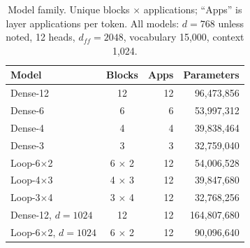 \begin{table}[t]
\centering
\caption{Model family. Unique blocks $\times$ applications; ``Apps'' is layer applications per token. All models: $d{=}768$ unless noted, 12 heads, $d_{ff}{=}2048$, vocabulary 15{,}000, context 1{,}024.}
\label{tab:models}
\begin{tabular}{lcrr}
\toprule
Model & Blocks & Apps & Parameters \\
\midrule
Dense-12 & 12 & 12 & 96,473,856 \\
Dense-6 & 6 & 6 & 53,997,312 \\
Dense-4 & 4 & 4 & 39,838,464 \\
Dense-3 & 3 & 3 & 32,759,040 \\
Loop-6$\times$2 & 6 $\times$ 2 & 12 & 54,006,528 \\
Loop-4$\times$3 & 4 $\times$ 3 & 12 & 39,847,680 \\
Loop-3$\times$4 & 3 $\times$ 4 & 12 & 32,768,256 \\
Dense-12, $d{=}1024$ & 12 & 12 & 164,807,680 \\
Loop-6$\times$2, $d{=}1024$ & 6 $\times$ 2 & 12 & 90,096,640 \\
\bottomrule
\end{tabular}
\end{table}
